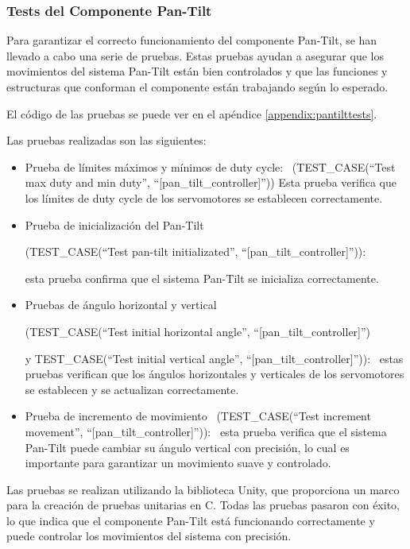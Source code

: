 \subsubsection{Tests del Componente Pan-Tilt}

Para garantizar el correcto funcionamiento del componente Pan-Tilt, se han llevado a cabo una serie de pruebas. Estas pruebas ayudan a asegurar que los movimientos del sistema Pan-Tilt están bien controlados y que las funciones y estructuras que conforman el componente están trabajando según lo esperado.



El código de las pruebas se puede ver en el apéndice \ref{appendix:pantilttests}.



Las pruebas realizadas son las siguientes:

\begin{itemize}

\item{Prueba de límites máximos y mínimos de duty cycle: 
\
(TEST\_CASE(``Test max duty and min duty'', ``[pan\_tilt\_controller]'')) 
Esta prueba verifica que los límites de duty cycle de los servomotores se establecen correctamente.
}
\item{ Prueba de inicialización del Pan-Tilt \

(TEST\_CASE(``Test pan-tilt initializated'', ``[pan\_tilt\_controller]'')): \

esta prueba confirma que el sistema Pan-Tilt se inicializa correctamente.
}
\item{ Pruebas de ángulo horizontal y vertical \

(TEST\_CASE(``Test initial horizontal angle'', ``[pan\_tilt\_controller]'') \

y TEST\_CASE(``Test initial vertical angle'', ``[pan\_tilt\_controller]'')): \
estas pruebas verifican que los ángulos horizontales y verticales de los servomotores se establecen y se actualizan correctamente.
}
\item{ Prueba de incremento de movimiento \
(TEST\_CASE(``Test increment movement'', ``[pan\_tilt\_controller]'')): \
esta prueba verifica que el sistema Pan-Tilt puede cambiar su ángulo vertical con precisión, lo cual es importante para garantizar un movimiento suave y controlado.
}
\end{itemize}


Las pruebas se realizan utilizando la biblioteca Unity, que proporciona un marco para la creación de pruebas unitarias en C. Todas las pruebas pasaron con éxito, lo que indica que el componente Pan-Tilt está funcionando correctamente y puede controlar los movimientos del sistema con precisión.

